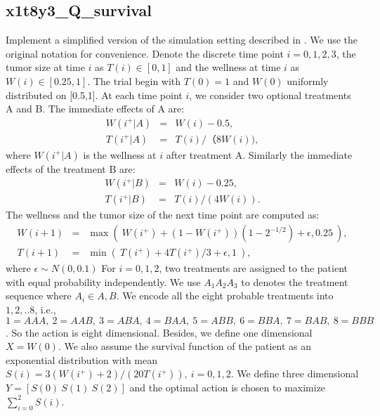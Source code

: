 \documentclass[12pt]{article}
\begin{document}
\subsection*{x1t8y3\_Q\_survival}
Implement a simplified version of the simulation setting described in \cite{goldberg2012q}. We use the original notation for convenience. Denote the discrete time point $i=0,1,2,3$, the tumor size at time $i$ as $T(i) \in [0,1]$ and the wellness at time $i$ as $W(i)\in [0.25,1]$. The trial begin with $T(0)=1$ and $W(0)$ uniformly distributed on [0.5,1]. At each time point $i$, we consider two optional treatments A and B. The immediate effects of A are:
\begin{eqnarray}
W(i^+|A)&=&W(i)-0.5,\\
T(i^+|A)&=&T(i)/（8W(i)),
\end{eqnarray}
where $W(i^+|A)$ is the wellness at $i$ after treatment A. Similarly the immediate effects of the treatment B are:
\begin{eqnarray}
W(i^+|B)&=&W(i)-0.25,\\
T(i^+|B)&=&T(i)/(4W(i)).
\end{eqnarray}
The wellness and the tumor size of the next time point are computed as:
\begin{eqnarray}
W(i+1)&=&\max(~W(i^+)+(1-W(i^+))(1-2^{-1/2})+\epsilon,0.25~),\\
T(i+1)&=&\min(~T(i^+)+4T(i^+)/3+\epsilon,1~),
\end{eqnarray}
where $\epsilon \sim N(0,0.1)$
For $i=0,1,2$, two treatments are assigned to the patient with equal probability independently. We use $A_1A_2A_3$ to denotes the treatment sequence where $A_i\in {A,B}$. We encode all the eight probable treatments into $1,2,..8$, i.e., $1=AAA,~2=AAB,~3=ABA,~4=BAA,~5=ABB,~6=BBA,~7=BAB,~8=BBB$. So the action is eight dimensional. Besides, we define one dimensional $X=W(0)$. We also assume the survival function of the patient as an exponential distribution with mean $S(i)=3(W(i^+)+2)/(20T(i^+)),~ i=0,1,2$. We define three dimensional $Y=[S(0)~S(1)~S(2)]$ and the optimal action is chosen to maximize $\sum_{i=0}^2 S(i)$.
\end{document}
